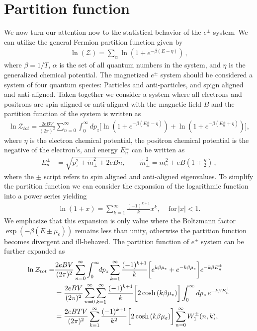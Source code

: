 \documentclass[Universe,article,submit,moreauthors,pdftex]{Definitions/mdpi}
\begin{document}
\section{Partition function}
\noindent We now turn our attention now to the statistical behavior of the $e^{\pm}$ system. We can utilize the general Fermion partition function given by
\begin{align}
  \label{PartFunc} \ln(\mathcal{Z})=\sum_{\alpha}\ln\left(1+e^{-\beta(E-\eta)}\right)\,,
\end{align}
where $\beta=1/T$, $\alpha$ is the set of all quantum numbers in the system, and $\eta$ is the generalized chemical potential. The magnetized $e^{\pm}$ system should be considered a system of four quantum species: Particles and anti-particles, and spign aligned and anti-aligned. Taken together we consider a system where all electrons and positrons are spin aligned or anti-aligned with the magnetic field $B$ and the partition function of the system is written as
\begin{align}
\ln\mathcal{Z}_{tot}=\frac{2eBV}{(2\pi)^2}\sum_{n=0}^\infty\int^\infty_{0} \!\!dp_z\bigg[\ln\left(1+e^{-\beta(E_{n}^\pm-\eta)}\right)+\ln\left(1+e^{-\beta(E_{n}^\pm+\eta)}\right)\bigg],
\end{align}
where $\eta$ is the electron chemical potential, the positron chemical potential is the negative of the electron's, and energy $E_{n}^\pm$ can be written as
\begin{align}
E_{n}^\pm&=\sqrt{p^2_z+\tilde m^2_\pm+2eBn},\qquad\tilde{m}^2_\pm=m^2_e+eB\left(1\mp\frac{g}{2}\right)\,,
\end{align}
where the $\pm$ script refers to spin aligned and anti-aligned eigenvalues. To simplify the partition function we can consider the expansion of the logarithmic function into a power series yielding
\begin{align}
\ln\left(1+x\right)=\sum^{\infty}_{k=1}\frac{(-1)^{k+1}}{k}x^k, \,\,\,\,\,\,\,\mathrm{for}\,|x|<1.
\end{align}
We emphasize that this expansion is only value where the Boltzmann factor $\exp\left(-\beta(E\pm\mu_{e})\right)$ remains less than unity, otherwise the partition function becomes divergent and ill-behaved. The partition function of $e^{\pm}$ system can be further expanded as
\begin{align}
\ln\mathcal{Z}_{tot}=&\frac{2eBV}{(2\pi)^2}\sum_{n=0}^\infty\int^\infty_{0} \!\!dp_z\sum^{\infty}_{k=1}\frac{(-1)^{k+1}}{k}\bigg[e^{k\beta\mu_e}+e^{-k\beta\mu_e}\bigg]e^{-k\beta E_n^\pm}\notag\\
&=\frac{2eBV}{(2\pi)^2}\sum_{n=0}^\infty\sum^{\infty}_{k=1}\frac{(-1)^{k+1}}{k}\bigg[2\cosh{(k\beta\mu_e)}\bigg]\int_0^\infty dp_z\,e^{-k\beta E_n^\pm}\notag\\
&=\frac{2eBTV}{(2\pi)^2}\sum^{\infty}_{k=1}\frac{(-1)^{k+1}}{k^2}\bigg[2\cosh{(k\beta\mu_e)}\bigg]\sum_{n=0}^\infty W^\pm_1(n,k),
\end{align}
\end{document}
